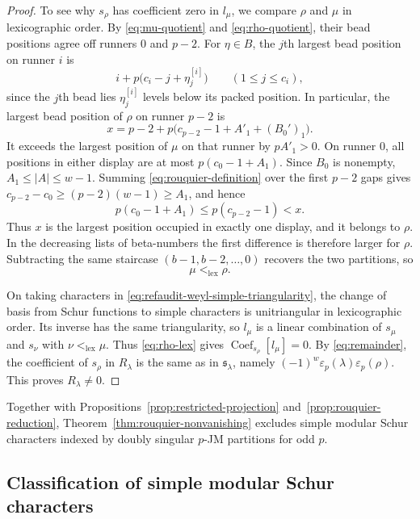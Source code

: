 \documentclass[12pt,reqno,a4paper]{amsart}
\numberwithin{equation}{section}
\numberwithin{figure}{section}
\theoremstyle{plain}
\theoremstyle{definition}
\newcommand{\eps}{\varepsilon}
\DeclareMathOperator{\Coef}{Coef}
\begin{document}
\begin{proof}
To see why $s_\rho$ has coefficient zero in $l_\mu$, we compare
$\rho$ and $\mu$ in lexicographic order.  By \eqref{eq:mu-quotient}
and \eqref{eq:rho-quotient}, their bead positions agree off runners
$0$ and $p-2$.  For $\eta\in B$, the $j$th largest bead position on
runner $i$ is
\begin{equation}\label{eq:runner-beta-set}
 i+p\bigl(c_i-j+\eta^{[i]}_j\bigr)\qquad(1\leq j\leq c_i),
\end{equation}
since the $j$th bead lies $\eta^{[i]}_j$ levels below its packed
position.  In particular, the largest bead position of $\rho$ on
runner $p-2$ is
\[
 x=p-2+p\bigl(c_{p-2}-1+A'_1+(B_0')_1\bigr).
\]
It exceeds the largest position of $\mu$ on that runner by
$pA'_1>0$.  On runner $0$, all positions in either display are at most
$p(c_0-1+A_1)$.  Since $B_0$ is nonempty, $A_1\leq |A|\leq w-1$.
Summing \eqref{eq:rouquier-definition} over the first $p-2$ gaps gives
$c_{p-2}-c_0\geq(p-2)(w-1)\geq A_1$, and hence
\[
 p(c_0-1+A_1)\leq p(c_{p-2}-1)<x.
\]
Thus $x$ is the largest position occupied in exactly one display,
and it belongs to $\rho$.  In the decreasing lists of beta-numbers
the first difference is therefore larger for $\rho$.  Subtracting
the same staircase $(b-1,b-2,\ldots,0)$ recovers the two partitions,
so
\begin{equation}\label{eq:rho-lex}
 \mu<_{\mathrm{lex}}\rho.
\end{equation}

On taking characters in \eqref{eq:refaudit-weyl-simple-triangularity},
the change of basis from Schur functions to simple characters is
unitriangular in lexicographic order.  Its inverse has the same
triangularity, so $l_\mu$ is a linear combination of $s_\mu$ and
$s_\nu$ with $\nu<_{\mathrm{lex}}\mu$.  Thus \eqref{eq:rho-lex}
gives $\Coef_{s_\rho}[l_\mu]=0$.  By \eqref{eq:remainder}, the
coefficient of $s_\rho$ in $R_\lambda$ is the same as in
$\mathfrak{s}_\lambda$, namely $(-1)^w\eps_p(\lambda)\eps_p(\rho)$.
This proves $R_\lambda\neq0$.
\end{proof}

Together with Propositions~\ref{prop:restricted-projection}
and~\ref{prop:rouquier-reduction},
Theorem~\ref{thm:rouquier-nonvanishing} excludes simple modular Schur
characters indexed by doubly singular $p$-JM partitions for odd $p$.

\subsection{Classification of simple modular Schur characters}
\label{subsec:carter-classification}
\end{document}
